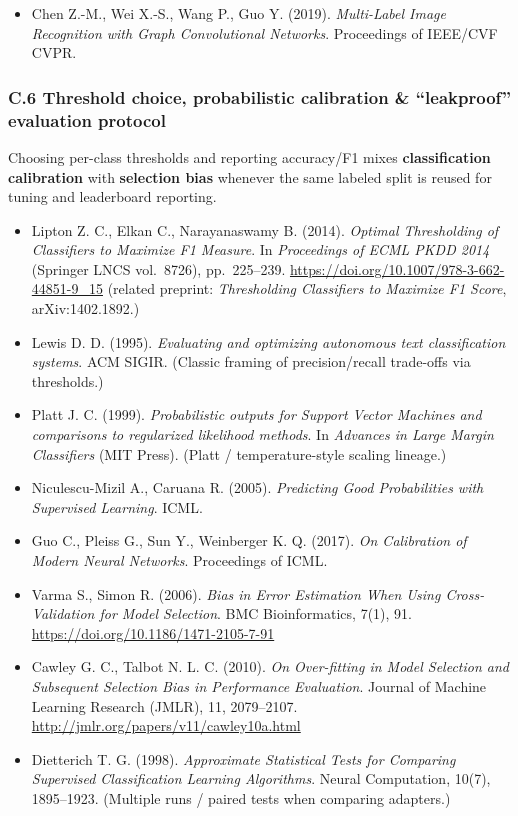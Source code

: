 \documentclass[
  11pt,
]{article}
\providecommand{\tightlist}{%
  \setlength{\itemsep}{0pt}\setlength{\parskip}{0pt}}
\begin{document}
\begin{itemize}
\tightlist
\item
  Chen Z.-M., Wei X.-S., Wang P., Guo Y. (2019). \emph{Multi-Label Image
  Recognition with Graph Convolutional Networks}. Proceedings of
  IEEE/CVF CVPR.
\end{itemize}

\subsubsection{C.6 Threshold choice, probabilistic calibration \&
``leakproof'' evaluation
protocol}\label{c.6-threshold-choice-probabilistic-calibration-leakproof-evaluation-protocol}

Choosing per-class thresholds and reporting accuracy/F1 mixes
\textbf{classification calibration} with \textbf{selection bias}
whenever the same labeled split is reused for tuning and leaderboard
reporting.

\begin{itemize}
\item
  Lipton Z. C., Elkan C., Narayanaswamy B. (2014). \emph{Optimal
  Thresholding of Classifiers to Maximize F1 Measure}. In
  \emph{Proceedings of ECML PKDD 2014} (Springer LNCS vol.~8726),
  pp.~225--239. \url{https://doi.org/10.1007/978-3-662-44851-9_15}
  (related preprint: \emph{Thresholding Classifiers to Maximize F1
  Score}, arXiv:1402.1892.)
\item
  Lewis D. D. (1995). \emph{Evaluating and optimizing autonomous text
  classification systems}. ACM SIGIR. (Classic framing of
  precision/recall trade-offs via thresholds.)
\item
  Platt J. C. (1999). \emph{Probabilistic outputs for Support Vector
  Machines and comparisons to regularized likelihood methods}. In
  \emph{Advances in Large Margin Classifiers} (MIT Press). (Platt /
  temperature-style scaling lineage.)
\item
  Niculescu-Mizil A., Caruana R. (2005). \emph{Predicting Good
  Probabilities with Supervised Learning}. ICML.
\item
  Guo C., Pleiss G., Sun Y., Weinberger K. Q. (2017). \emph{On
  Calibration of Modern Neural Networks}. Proceedings of ICML.
\item
  Varma S., Simon R. (2006). \emph{Bias in Error Estimation When Using
  Cross-Validation for Model Selection}. BMC Bioinformatics, 7(1), 91.
  \url{https://doi.org/10.1186/1471-2105-7-91}
\item
  Cawley G. C., Talbot N. L. C. (2010). \emph{On Over-fitting in Model
  Selection and Subsequent Selection Bias in Performance Evaluation}.
  Journal of Machine Learning Research (JMLR), 11, 2079--2107.
  \url{http://jmlr.org/papers/v11/cawley10a.html}
\item
  Dietterich T. G. (1998). \emph{Approximate Statistical Tests for
  Comparing Supervised Classification Learning Algorithms}. Neural
  Computation, 10(7), 1895--1923. (Multiple runs / paired tests when
  comparing adapters.)
\end{itemize}
\end{document}
